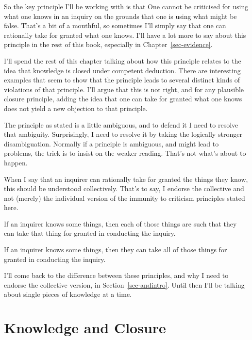 \documentclass[
  10pt,
  letterpaper,
  twoside]{scrbook}
\providecommand{\tightlist}{%
  \setlength{\itemsep}{0pt}\setlength{\parskip}{0pt}}\usepackage{longtable,booktabs,array}
\begin{document}
So the key principle I'll be working with is that One cannot be
criticised for using what one knows in an inquiry on the grounds that
one is using what might be false. That's a bit of a mouthful, so
sometimes I'll simply say that one can rationally take for granted what
one knows. I'll have a lot more to say about this principle in the rest
of this book, especially in Chapter~\ref{sec-evidence}.

I'll spend the rest of this chapter talking about how this principle
relates to the idea that knowledge is closed under competent deduction.
There are interesting examples that seem to show that the principle
leads to several distinct kinds of violations of that principle. I'll
argue that this is not right, and for any plausible closure principle,
adding the idea that one can take for granted what one knows does not
yield a new objection to that principle.

The principle as stated is a little ambiguous, and to defend it I need
to resolve that ambiguity. Surprisingly, I need to resolve it by taking
the logically stronger disambiguation. Normally if a principle is
ambiguous, and might lead to problems, the trick is to insist on the
weaker reading. That's not what's about to happen.

When I say that an inquirer can rationally take for granted the things
they know, this should be understood collectively. That's to say, I
endorse the collective and not (merely) the individual version of the
immunity to criticism principles stated here.

\begin{description}
\tightlist
\item[Take for Granted (Individual)]
If an inquirer knows some things, then each of those things are such
that they can take that thing for granted in conducting the inquiry.
\item[Take for Granted (Collective)]
If an inquirer knows some things, then they can take all of those things
for granted in conducting the inquiry.
\end{description}

I'll come back to the difference between these principles, and why I
need to endorse the collective version, in Section~\ref{sec-andintro}.
Until then I'll be talking about single pieces of knowledge at a time.

\section{Knowledge and Closure}\label{knowledge-and-closure}
\end{document}
